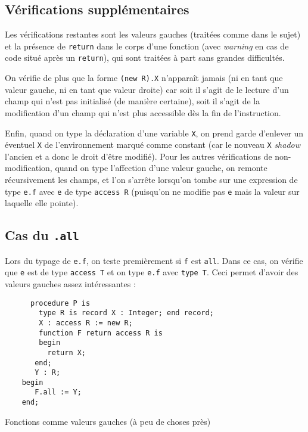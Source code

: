 \documentclass[a4paper, 10pt, french]{article}
\newcommand{\codeAda}[1]{\texttt{#1}}
\newcommand{\code}[1]{\texttt{#1}}
\begin{document}
\subsection{Vérifications supplémentaires}

Les vérifications restantes sont les valeurs gauches (traitées comme dans le sujet) et la présence de \codeAda{return} dans le corps d'une fonction (avec \emph{warning} en cas de code situé après un \codeAda{return}), qui sont traitées à part sans grandes difficultés.

On vérifie de plus que la forme \codeAda{(new R).X} n'apparaît jamais (ni en tant que valeur gauche, ni en tant que valeur droite) car soit il s'agit de le lecture d'un champ qui n'est pas initialisé (de manière certaine), soit il s'agit de la modification d'un champ qui n'est plus accessible dès la fin de l'instruction.

Enfin, quand on type la déclaration d'une variable \codeAda{X}, on prend garde d'enlever un éventuel \codeAda{X} de l'environnement marqué comme constant (car le nouveau \codeAda{X} \emph{shadow} l'ancien et a donc le droit d'être modifié). Pour les autres vérifications de non-modification, quand on type l'affection d'une valeur gauche, on remonte récursivement les champs, et l'on s'arrête lorsqu'on tombe sur une expression de type \codeAda{e.f} avec \codeAda{e} de type \codeAda{access R} (puisqu'on ne modifie pas \code{e} mais la valeur sur laquelle elle pointe).


\subsection{Cas du \codeAda{.all}}

Lors du typage de \codeAda{e.f}, on teste premièrement si \codeAda{f} est \codeAda{all}. Dans ce cas, on vérifie que \codeAda{e} est de type \codeAda{access T} et on type \codeAda{e.f} avec \codeAda{type T}. Ceci permet d'avoir des valeurs gauches assez intéressantes :
\begin{table}[H]
  \centering
  \begin{verbatim}
      procedure P is
        type R is record X : Integer; end record;
        X : access R := new R;
        function F return access R is
        begin
          return X;
       end;
       Y : R;
    begin
       F.all := Y;
    end;
    \end{verbatim}
    \caption{Fonctions comme valeurs gauches (à peu de choses près)}
\end{table}
\end{document}
